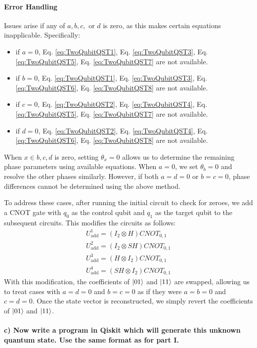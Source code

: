 \documentclass[a4paper, 11pt]{article}
\begin{document}
\paragraph{Error Handling}
Issues arise if any of $a, b, c,$ or $d$ is zero, as this makes certain equations inapplicable. Specifically:
\begin{itemize}
  \item if $a = 0$, Eq. \ref{eq:TwoQubitQST1}, Eq. \ref{eq:TwoQubitQST3}, Eq. \ref{eq:TwoQubitQST5}, Eq. \ref{eq:TwoQubitQST7} are not available.
  \item if $b = 0$, Eq. \ref{eq:TwoQubitQST1}, Eq. \ref{eq:TwoQubitQST3}, Eq. \ref{eq:TwoQubitQST6}, Eq. \ref{eq:TwoQubitQST8} are not available.
  \item if $c = 0$, Eq. \ref{eq:TwoQubitQST2}, Eq. \ref{eq:TwoQubitQST4}, Eq. \ref{eq:TwoQubitQST5}, Eq. \ref{eq:TwoQubitQST7} are not available.
  \item if $d = 0$, Eq. \ref{eq:TwoQubitQST2}, Eq. \ref{eq:TwoQubitQST4}, Eq. \ref{eq:TwoQubitQST6}, Eq. \ref{eq:TwoQubitQST8} are not available.
\end{itemize}
When $x \in {b, c, d}$ is zero, setting $\theta_{x} = 0$ allows us to determine the remaining phase parameters using available equations. 
When $a = 0$, we set $\theta_b = 0$ and resolve the other phases similarly. 
However, if both $a = d = 0$ or $b = c = 0$, phase differences cannot be determined using the above method.

To address these cases, after running the initial circuit to check for zeroes, we add a CNOT gate with $q_0$ as the control qubit and $q_1$ as the target qubit to the subsequent circuits. 
This modifies the circuits as follows:
\begin{align}
  U_{\text{add}}^{1} = (I_2 \otimes H ) CNOT_{0,1} \\
  U_{\text{add}}^{2} = (I_2 \otimes SH) CNOT_{0,1} \\
  U_{\text{add}}^{3} = (H \otimes I_2 ) CNOT_{0,1} \\
  U_{\text{add}}^{4} = (SH \otimes I_2) CNOT_{0,1} 
\end{align}
With this modification, the coefficients of $\ket{01}$ and $\ket{11}$ are swapped, 
allowing us to treat cases with $a = d = 0$ and $b = c = 0$ as if they were $a = b = 0$ and $c = d = 0$. 
Once the state vector is reconstructed, we simply revert the coefficients of $\ket{01}$ and $\ket{11}$.

\paragraph{c) Now write a program in Qiskit which will generate this unknown quantum state. Use the same format as for part I.}
\end{document}

